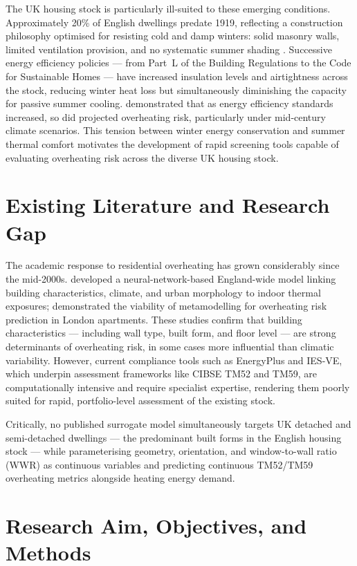 \documentclass[12pt,a4paper]{report}
\begin{document}
The UK housing stock is particularly ill-suited to these emerging conditions. Approximately 20\% of English dwellings predate 1919, reflecting a construction philosophy optimised for resisting cold and damp winters: solid masonry walls, limited ventilation provision, and no systematic summer shading \citep{Piddington2020}. Successive energy efficiency policies --- from Part~L of the Building Regulations to the Code for Sustainable Homes --- have increased insulation levels and airtightness across the stock, reducing winter heat loss but simultaneously diminishing the capacity for passive summer cooling. \citet{Mulville2016} demonstrated that as energy efficiency standards increased, so did projected overheating risk, particularly under mid-century climate scenarios. This tension between winter energy conservation and summer thermal comfort motivates the development of rapid screening tools capable of evaluating overheating risk across the diverse UK housing stock.


\section{Existing Literature and Research Gap}
\label{sec:lit-gap}

The academic response to residential overheating has grown considerably since the mid-2000s. \citet{Symonds2016} developed a neural-network-based England-wide model linking building characteristics, climate, and urban morphology to indoor thermal exposures; \citet{Botti2022} demonstrated the viability of metamodelling for overheating risk prediction in London apartments. These studies confirm that building characteristics --- including wall type, built form, and floor level --- are strong determinants of overheating risk, in some cases more influential than climatic variability. However, current compliance tools such as EnergyPlus and IES-VE, which underpin assessment frameworks like CIBSE TM52 and TM59, are computationally intensive and require specialist expertise, rendering them poorly suited for rapid, portfolio-level assessment of the existing stock.

Critically, no published surrogate model simultaneously targets UK detached and semi-detached dwellings --- the predominant built forms in the English housing stock --- while parameterising geometry, orientation, and window-to-wall ratio (WWR) as continuous variables and predicting continuous TM52/TM59 overheating metrics alongside heating energy demand.


\section{Research Aim, Objectives, and Methods}
\label{sec:aim}
\end{document}
